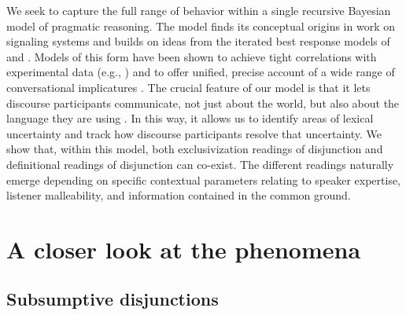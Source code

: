 \documentclass{article}
\begin{document}
We seek to capture the full range of behavior within a single
recursive Bayesian model of pragmatic reasoning. The model finds its
conceptual origins in  work on signaling systems
and builds on ideas from the iterated best response models of
\citet{Jaeger:2007} and \citet{Franke09DISS}. Models of this form have
been shown to achieve tight correlations with experimental data (e.g.,
\citealt{Frank:Goodman:2012}) and to offer unified, precise account of
a wide range of conversational implicatures
\citep{Bergen:Levy:Goodman:2014}. The crucial feature of our model is
that it lets discourse participants communicate, not just about the
world, but also about the language they are using
\citep{Smith:Goodman:Frank:2013}. In this way, it allows us to
identify areas of lexical uncertainty and track how discourse
participants resolve that uncertainty. We show that, within this
model, both exclusivization readings of disjunction and definitional
readings of disjunction can co-exist.  The different readings
naturally emerge depending on specific contextual parameters relating
to speaker expertise, listener malleability, and information contained
in the common ground.



\section{A closer look at the phenomena}\label{sec:data}


\subsection{Subsumptive disjunctions}\label{sec:data:subsumptive}
\end{document}
